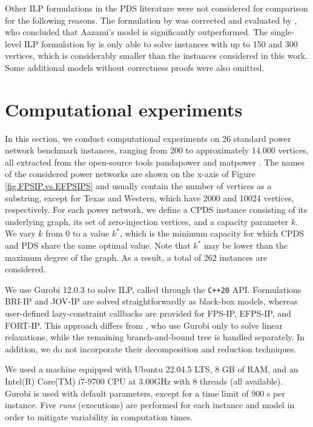 \documentclass{article}
\newcommand{\FPSIP}{FPS-IP\xspace}
\newcommand{\EFPSIP}{EFPS-IP\xspace}
\newcommand{\BRIIP}{BRI-IP\xspace}
\newcommand{\JOVIP}{JOV-IP\xspace}
\newcommand{\FORTIP}{FORT-IP\xspace}
\begin{document}
\medskip

Other ILP formulations in the PDS literature were not considered for comparison for the following reasons. 
The formulation by \citet{Aazami2010} was corrected and evaluated by \citet{Brimkov2019}, who concluded that Aazami's model is significantly outperformed.
The single-level ILP formulation by \citet{Carvalho2018} is only able to solve instances with up to 150 and 300 vertices, which is considerably smaller than the instances considered in this work.
Some additional models without correctness proofs were also omitted.
 
\section{Computational experiments}\label{sec.experiments}

In this section, we conduct computational experiments on 26 standard power network benchmark instances, ranging from 200 to approximately 14.000 vertices, all extracted from the open-source tools pandapower \citep{PANDAPOWER} and matpower \citep{MATPOWER}.
The names of the considered power networks are shown on the x-axis of Figure \ref{fig.FPSIP.vs.EFPSIPS} and usually contain the number of vertices as a substring, except for Texas and Western, which have 2000 and 10024 vertices, respectively.
For each power network, we define a CPDS instance consisting of its underlying graph, its set of zero-injection vertices, and a capacity parameter $k$.
We vary $k$ from 0 to a value $k^*$, which is the minimum capacity for which CPDS and PDS share the same optimal value.
Note that $k^*$ may be lower than the maximum degree of the graph.
As a result, a total of 262 instances are considered. 

We use Gurobi 12.0.3 \citep{GUROBI} to solve ILP, called through the \texttt{C++20} API.
Formulations \BRIIP and \JOVIP are solved straightforwardly as black-box models, whereas user-defined lazy-constraint callbacks are provided for \FPSIP, \EFPSIP, and \FORTIP.
This approach differs from \citet{Blasius2024}, who use Gurobi only to solve linear relaxations, while the remaining branch-and-bound tree is handled separately.
In addition, we do not incorporate their decomposition and reduction techniques.

We used a machine equipped with Ubuntu 22.04.5 LTS, 8 GB of RAM, and an Intel(R) Core(TM) i7-9700 CPU at 3.00GHz with 8 threads (all available).
Gurobi is used with default parameters, except for a time limit of 900 s per instance.
Five \emph{runs} (executions) are performed for each instance and model in order to mitigate variability in computation times.
\end{document}
